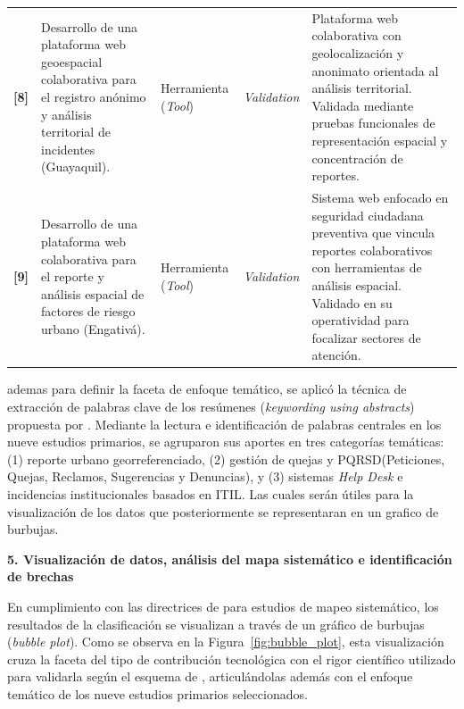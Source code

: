 \begin{longtable}{@{} c >{\raggedright\arraybackslash}p{4cm} l l >{\raggedright\arraybackslash}p{5.5cm} @{}}
	\addlinespace
	\textbf{[8]} & Desarrollo de una plataforma web geoespacial colaborativa para el registro anónimo y análisis territorial de incidentes (Guayaquil). & Herramienta (\textit{Tool}) & \textit{Validation} & Plataforma web colaborativa con geolocalización y anonimato orientada al análisis territorial. Validada mediante pruebas funcionales de representación espacial y concentración de reportes. \\
	\addlinespace
	\textbf{[9]} & Desarrollo de una plataforma web colaborativa para el reporte y análisis espacial de factores de riesgo urbano (Engativá). & Herramienta (\textit{Tool}) & \textit{Validation} & Sistema web enfocado en seguridad ciudadana preventiva que vincula reportes colaborativos con herramientas de análisis espacial. Validado en su operatividad para focalizar sectores de atención. \\
\end{longtable}

	ademas para definir la faceta de enfoque temático, se aplicó la técnica de extracción de palabras clave de los resúmenes (\textit{keywording using abstracts}) propuesta por \textcite{petersen2008systematic}. Mediante la lectura e identificación de palabras centrales en los nueve estudios primarios, se agruparon sus aportes en tres categorías temáticas: (1) reporte urbano georreferenciado, (2) gestión de quejas y PQRSD(Peticiones, Quejas, Reclamos, Sugerencias y Denuncias), y (3) sistemas \textit{Help Desk} e incidencias institucionales basados en ITIL. Las cuales serán útiles para la visualización de los datos que posteriormente se representaran en un grafico de burbujas.



\textbf{5. Visualización de datos, análisis del mapa sistemático e identificación de brechas}

En cumplimiento con las directrices de \textcite{petersen2008systematic} para estudios de mapeo sistemático, los resultados de la clasificación se visualizan a través de un gráfico de burbujas (\textit{bubble plot}). Como se observa en la Figura~\ref{fig:bubble_plot}, esta visualización cruza la faceta del tipo de contribución tecnológica con el rigor científico utilizado para validarla según el esquema de \textcite{wieringa2014design}, articulándolas además con el enfoque temático de los nueve estudios primarios seleccionados.

